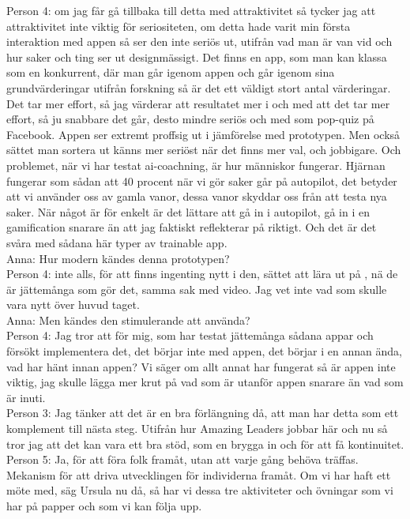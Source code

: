 Person 4: om jag får gå tillbaka till detta med attraktivitet så tycker jag att attraktivitet inte viktig för seriositeten, om detta hade varit min första interaktion med appen så ser den inte seriös ut, utifrån vad man är van vid och hur saker och ting ser ut designmässigt. 
Det finns en app, som man kan klassa som en konkurrent, där man går igenom appen och går igenom sina grundvärderingar utifrån forskning så är det ett väldigt stort antal värderingar. Det tar mer effort, så jag värderar att resultatet mer i och med att det tar mer effort, så ju snabbare det går, desto mindre seriös och med som pop-quiz på Facebook. Appen ser extremt proffsig ut i jämförelse med prototypen. Men också sättet man sortera ut känns mer seriöst när det finns mer val, och jobbigare. Och problemet, när vi har testat ai-coachning, är hur människor fungerar. Hjärnan fungerar som sådan att 40 procent när vi gör saker går på autopilot, det betyder att vi använder oss av gamla vanor, dessa vanor skyddar oss från att testa nya saker. När något är för enkelt är det lättare att gå in i autopilot, gå in i en gamification snarare än att jag faktiskt reflekterar på riktigt. Och det är det svåra med sådana här typer av trainable app. \\

Anna: Hur modern kändes denna prototypen?\\

Person 4: inte alls, för att finns ingenting nytt i den, sättet att lära ut på , nä de är jättemånga som gör det, samma sak med video. Jag vet inte vad som skulle vara nytt över huvud taget.\\

Anna: Men kändes den stimulerande att använda?\\

Person 4: Jag tror att för mig, som har testat jättemånga sådana appar och försökt implementera det, det börjar inte med appen, det börjar i en annan ända, vad har hänt innan appen? Vi säger om allt annat har fungerat så är appen inte viktig, jag skulle lägga mer krut på vad som är utanför appen snarare än vad som är inuti.\\ 

Person 3: Jag tänker att det är en bra förlängning då, att man har detta som ett komplement till nästa steg. Utifrån hur Amazing Leaders jobbar här och nu så tror jag att det kan vara ett bra stöd, som en brygga in och för att få kontinuitet. \\

Person 5: Ja, för att föra folk framåt, utan att varje gång behöva träffas. Mekanism för att driva utvecklingen för individerna framåt. Om vi har haft ett möte med, säg Ursula nu då, så har vi dessa tre aktiviteter och övningar som vi har på papper och som vi kan följa upp.\\ 

